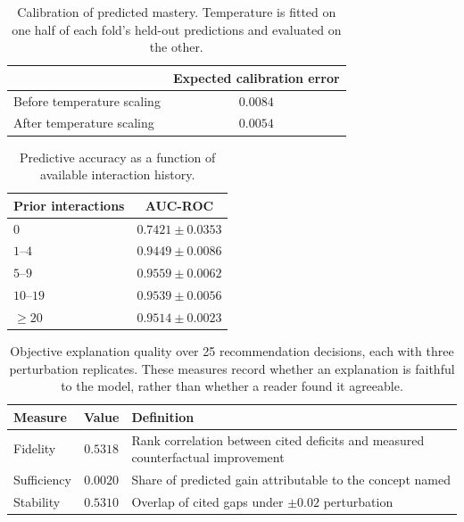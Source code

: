 \documentclass[conference]{IEEEtran}
\begin{document}
\begin{table}[t]
\centering
\caption{Calibration of predicted mastery. Temperature is fitted on one half of each
fold's held-out predictions and evaluated on the other.}
\label{tab:calibration}
\begin{tabular}{lc}
\toprule
& Expected calibration error \\
\midrule
Before temperature scaling & $0.0084$ \\
After temperature scaling  & $\mathbf{0.0054}$ \\
\bottomrule
\end{tabular}
\end{table}

\begin{table}[t]
\centering
\caption{Predictive accuracy as a function of available interaction history.}
\label{tab:coldstart}
\begin{tabular}{lc}
\toprule
Prior interactions & AUC-ROC \\
\midrule
$0$        & $0.7421 \pm 0.0353$ \\
$1$--$4$   & $0.9449 \pm 0.0086$ \\
$5$--$9$   & $0.9559 \pm 0.0062$ \\
$10$--$19$ & $0.9539 \pm 0.0056$ \\
$\geq 20$  & $0.9514 \pm 0.0023$ \\
\bottomrule
\end{tabular}
\end{table}

\begin{table}[t]
\centering
\caption{Objective explanation quality over 25 recommendation decisions, each with
three perturbation replicates. These measures record whether an explanation is faithful
to the model, rather than whether a reader found it agreeable.}
\label{tab:explanation}
\begin{tabular}{lcp{3.1cm}}
\toprule
Measure & Value & Definition \\
\midrule
Fidelity    & $0.5318$ & Rank correlation between cited deficits and measured counterfactual improvement \\
Sufficiency & $0.0020$ & Share of predicted gain attributable to the concept named \\
Stability   & $0.5310$ & Overlap of cited gaps under $\pm 0.02$ perturbation \\
\bottomrule
\end{tabular}
\end{table}
\end{document}
